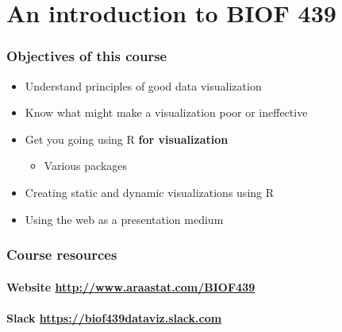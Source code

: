 \documentclass[12pt,letterpaperpaper,openany]{book}
\providecommand{\tightlist}{%
  \setlength{\itemsep}{0pt}\setlength{\parskip}{0pt}}
\begin{document}
\hypertarget{an-introduction-to-biof-439}{%
\chapter{An introduction to BIOF 439}\label{an-introduction-to-biof-439}}

\hypertarget{objectives-of-this-course}{%
\subsection{Objectives of this course}\label{objectives-of-this-course}}

\begin{itemize}
\tightlist
\item
  Understand principles of good data visualization
\item
  Know what might make a visualization poor or ineffective
\item
  Get you going using R \textbf{for visualization}

  \begin{itemize}
  \tightlist
  \item
    Various packages
  \end{itemize}
\item
  Creating static and dynamic visualizations using R
\item
  Using the web as a presentation medium
\end{itemize}

\hypertarget{course-resources}{%
\subsection{Course resources}\label{course-resources}}

\hypertarget{website-httpwww.araastat.combiof439}{%
\subsubsection{\texorpdfstring{Website \url{http://www.araastat.com/BIOF439}}{Website http://www.araastat.com/BIOF439}}\label{website-httpwww.araastat.combiof439}}

\hypertarget{slack-httpsbiof439dataviz.slack.com}{%
\subsubsection{\texorpdfstring{Slack \url{https://biof439dataviz.slack.com}}{Slack https://biof439dataviz.slack.com}}\label{slack-httpsbiof439dataviz.slack.com}}
\end{document}
